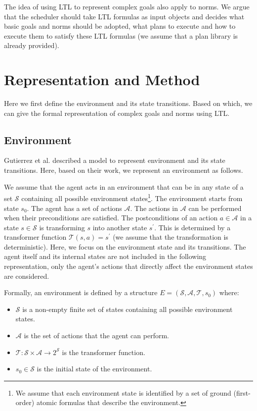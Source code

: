\documentclass{article}
\begin{document}
%
The idea of using LTL to represent complex goals also apply to norms.
We argue that the scheduler should take LTL formulas as input objects and decides what basic goals and norms should be adopted, what plans to execute and how to execute them to satisfy these LTL formulas (we assume that a plan library is already provided).

\section{Representation and Method}
Here we first define the environment and its state transitions. Based on which, we can give the formal representation of complex goals and norms using LTL.

\subsection*{Environment}
Gutierrez et al.\cite{DBLP:conf/time/0001KPW22} described a model to represent environment and its state transitions. Here, based on their work, we represent an environment as follows.

We assume that the agent acts in an environment that can be in any state of a set $\mathcal{S}$ containing all possible environment states\footnote{We assume that each environment state is identified by a set of ground (first-order) atomic formulas that describe the environment.}. The environment starts from state $s_0$. The agent has a set of actions $\mathcal{A}$. The actions in $\mathcal{A}$ can be performed when their preconditions are satisfied. The postconditions of an action $a \in \mathcal{A}$ in a state $s \in \mathcal{S}$ is transforming $s$ into another state $s^\prime$. This is determined by a transformer function $\mathcal{T} (s, a) = s^\prime$ (we assume that the transformation is deterministic). Here, we focus on the environment state and its transitions. The agent itself and its internal states are not included in the following representation, only the agent's actions that directly affect the environment states are considered.

Formally, an environment is defined by a structure $E=(\mathcal{S}, \mathcal{A},\mathcal{T}, s_0)$ where:
\begin{itemize}
    \item $\mathcal{S}$ is a non-empty finite set of states containing all possible environment states.
    \item $\mathcal{A}$ is the set of actions that the agent can perform.
    \item $\mathcal{T}: \mathcal{S} \times \mathcal{A} \rightarrow 2^{\mathcal{S}}$ is the transformer function.
    \item $s_0 \in \mathcal{S}$ is the initial state of the environment.
\end{itemize}
\end{document}
